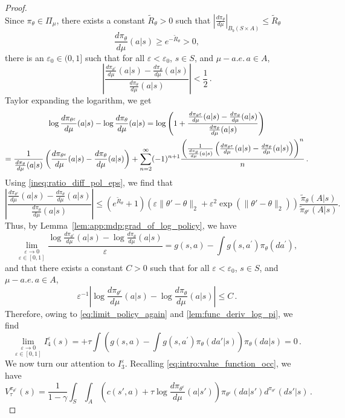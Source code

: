 \documentclass{amsart}
\theoremstyle{definition}
\begin{document}
\begin{proof}
\begin{equation}
\end{equation}
Since $\pi_\theta \in \Pi_\mu$, there exists a constant $\tilde{R}_\theta >0$ such that $\left|\frac{d \pi_{\theta}}{d \mu}\right|_{B_b(S \times A)} \leq \tilde{R}_\theta $
\[
\frac{d\pi_{\theta}}{d\mu}(a|s) \geq e^{-\tilde{R}_\theta}>0,
\]
there is an $\varepsilon_0\in (0,1]$ such that  for all $\varepsilon<\varepsilon_0$, $s\in S$, and $\mu-a.e. \,a\in A$,
\[
\left|\frac{\frac{d\pi_{\theta^{\varepsilon}}}{d\mu}(a|s)-\frac{d\pi_{\theta}}{d\mu}(a|s)}{\frac{d\pi_{\theta}}{d\mu}(a|s)}\right|<\frac{1}{2}\,.
\]
Taylor expanding the logarithm, we get 
\begin{gather*}
\log\frac{d\pi_{\theta^{\varepsilon}}}{d\mu}(a|s) -\log\frac{d\pi_{\theta}}{d\mu}(a|s) =\log\left(1+\frac{\frac{d\pi_{\theta^{\varepsilon}}}{d\mu}(a|s)-\frac{d\pi_{\theta}}{d\mu}(a|s)}{\frac{d\pi_{\theta}}{d\mu}(a|s)}\right)\notag\\
=\frac{1}{\frac{d\pi_{\theta}}{d\mu}(a|s)}\left(\frac{d\pi_{\theta^{\varepsilon}}}{d\mu}(a|s)-\frac{d\pi_{\theta}}{d\mu}(a|s)\right)+\sum_{n=2}^{\infty}(-1)^{n+1}\frac{\left(\frac{1}{\frac{d\pi_{\theta}}{d\mu}(a|s)}\left(\frac{d\pi_{\theta^{\varepsilon}}}{d\mu}(a|s)-\frac{d\pi_{\theta}}{d\mu}(a|s)\right)\right)^n}{n}\,.
\end{gather*}
Using \eqref{ineq:ratio_diff_pol_eps}, we find that 
\[
\left|\frac{\frac{d\pi_{\theta^{\varepsilon}}}{d\mu}(a|s)-\frac{d\pi_{\theta}}{d\mu}(a|s)}{\frac{d\pi_{\theta}}{d\mu}(a|s)}\right|\le \left(e^{\tilde{R}_\theta } + 1\right)\left(\varepsilon \|\theta'-\theta\|_{2}+\varepsilon^2 \exp\left(\|\theta'-\theta\|_{2}\right)\right)\frac{\tilde{\pi}_{\theta}(A|s)}{\tilde{\pi}_{\theta^{\varepsilon}}(A|s)}.
\]
Thus, by Lemma~\ref{lem:app:mdp:grad_of_log_policy}, we have
\begin{equation}
\underset{\varepsilon \in [0,1]}{\lim_{\varepsilon\rightarrow 0}}\frac{\log\frac{d\pi_{\theta^{\varepsilon}}}{d\mu}(a|s) -\log\frac{d\pi_{\theta}}{d\mu}(a|s) }{\varepsilon}= g(s,a) - \int g(s,a^\prime)\pi_\theta(da^\prime),\label{lem:func_deriv_log_pi}
\end{equation}
and that there exists a constant $C>0$ such that for all $\varepsilon<\varepsilon_0$, $s\in S$, and $\mu-a.e. \,a\in A$,
\[
\varepsilon^{-1}\left|\log\frac{d\pi_{\theta^{\varepsilon}}}{d\mu}(a|s) -\log\frac{d\pi_{\theta}}{d\mu}(a|s)\right| \le C\,.
\]
Therefore, owing to \eqref{eq:limit_policy_again} and \eqref{lem:func_deriv_log_pi}, we find
\[
\underset{\varepsilon \in [0,1]}{\lim_{\varepsilon\rightarrow 0}}I_4^{\varepsilon}(s)=+\tau\int\left( g(s,a)-\int g(s,a^\prime)\pi_{\theta}(da'|s)\right)\pi_{\theta}(da|s)=0\,.
\]
We now turn our attention to  $I_3^{\varepsilon}$. Recalling \eqref{eq:intro:value_function_occ}, we have 
\[
V^{\pi_{\theta^{\varepsilon}}}_{\tau}(s)=\frac{1}{1-\gamma}\int_{S}\int_A\left(c(s',a)+\tau\log\frac{d\pi_{\theta^{\varepsilon}}}{d\mu}(a|s')\right)\pi_{\theta^{\varepsilon}}(da|s')d^{\pi_{\theta^{\varepsilon}}}(ds'|s)\,.
\]


\end{proof}
\end{document}
